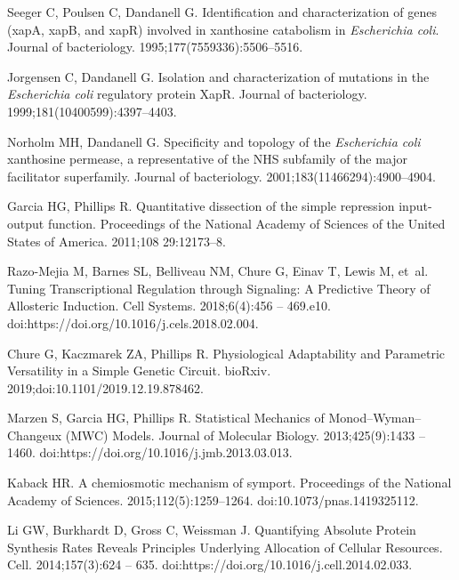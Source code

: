 \documentclass[10pt,letterpaper]{article}
\begin{document}
\begin{thebibliography}{10}
		Seeger C, Poulsen C, Dandanell G.
		\newblock Identification and characterization of genes (xapA, xapB, and xapR)
		involved in xanthosine catabolism in \emph{Escherichia coli}.
		\newblock Journal of bacteriology. 1995;177(7559336):5506--5516.
		
		Jorgensen C, Dandanell G.
		\newblock Isolation and characterization of mutations in the \emph{Escherichia
			coli} regulatory protein XapR.
		\newblock Journal of bacteriology. 1999;181(10400599):4397--4403.
		
		Norholm MH, Dandanell G.
		\newblock Specificity and topology of the \emph{Escherichia coli} xanthosine
		permease, a representative of the NHS subfamily of the major facilitator
		superfamily.
		\newblock Journal of bacteriology. 2001;183(11466294):4900--4904.
		
		Garcia HG, Phillips R.
		\newblock Quantitative dissection of the simple repression input-output
		function.
		\newblock Proceedings of the National Academy of Sciences of the United States
		of America. 2011;108 29:12173--8.
		
		Razo-Mejia M, Barnes SL, Belliveau NM, Chure G, Einav T, Lewis M, et~al.
		\newblock Tuning Transcriptional Regulation through Signaling: A Predictive
		Theory of Allosteric Induction.
		\newblock Cell Systems. 2018;6(4):456 -- 469.e10.
		\newblock doi:{https://doi.org/10.1016/j.cels.2018.02.004}.
		
		Chure G, Kaczmarek ZA, Phillips R.
		\newblock Physiological Adaptability and Parametric Versatility in a Simple
		Genetic Circuit.
		\newblock bioRxiv. 2019;doi:{10.1101/2019.12.19.878462}.
		
		Marzen S, Garcia HG, Phillips R.
		\newblock Statistical Mechanics of Monod--Wyman--Changeux (MWC) Models.
		\newblock Journal of Molecular Biology. 2013;425(9):1433 -- 1460.
		\newblock doi:{https://doi.org/10.1016/j.jmb.2013.03.013}.
		
		Kaback HR.
		\newblock A chemiosmotic mechanism of symport.
		\newblock Proceedings of the National Academy of Sciences.
		2015;112(5):1259--1264.
		\newblock doi:{10.1073/pnas.1419325112}.
		
		Li GW, Burkhardt D, Gross C, Weissman J.
		\newblock Quantifying Absolute Protein Synthesis Rates Reveals Principles
		Underlying Allocation of Cellular Resources.
		\newblock Cell. 2014;157(3):624 -- 635.
		\newblock doi:{https://doi.org/10.1016/j.cell.2014.02.033}.
		

\end{thebibliography}
\end{document}
